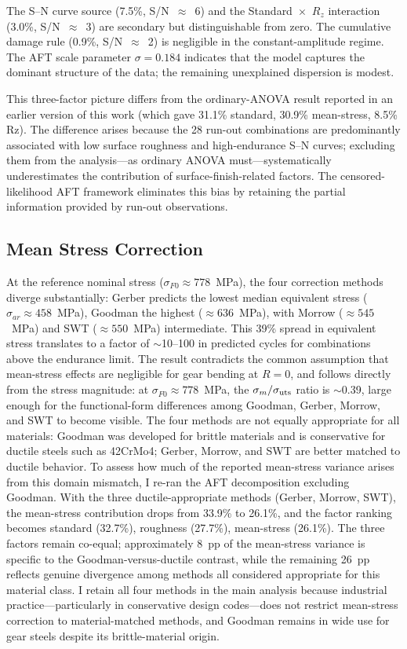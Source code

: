 \documentclass[12pt,a4paper]{article}
\begin{document}
The S--N curve source (7.5\%, S/N~$\approx$~6) and the
Standard~$\times$~$R_z$ interaction (3.0\%, S/N~$\approx$~3) are secondary but
distinguishable from zero. The cumulative damage rule (0.9\%,
S/N~$\approx$~2) is negligible in the constant-amplitude regime. The
AFT scale parameter $\sigma = 0.184$ indicates that the model
captures the dominant structure of the data; the remaining
unexplained dispersion is modest.

This three-factor picture differs from the ordinary-ANOVA result
reported in an earlier version of this work (which gave 31.1\%
standard, 30.9\% mean-stress, 8.5\% Rz). The difference arises
because the 28 run-out combinations are predominantly associated
with low surface roughness and high-endurance S--N curves; excluding
them from the analysis---as ordinary ANOVA must---systematically
underestimates the contribution of surface-finish-related factors.
The censored-likelihood AFT framework eliminates this bias by
retaining the partial information provided by run-out observations.

\subsection{Mean Stress Correction}

At the reference nominal stress ($\sigma_{F0} \approx 778$~MPa), the
four correction methods diverge substantially: Gerber predicts the
lowest median equivalent stress ($\sigma_{ar} \approx 458$~MPa),
Goodman the highest ($\approx 636$~MPa), with Morrow ($\approx 545$~MPa)
and SWT ($\approx 550$~MPa) intermediate. This 39\% spread in
equivalent stress translates to a factor of $\sim$10--100 in predicted
cycles for combinations above the endurance limit. The result contradicts
the common assumption that mean-stress effects are negligible for gear
bending at $R=0$, and follows directly from the stress magnitude: at
$\sigma_{F0} \approx 778$~MPa, the $\sigma_m/\sigma_{\rm uts}$ ratio
is $\sim$0.39, large enough for the functional-form differences among
Goodman, Gerber, Morrow, and SWT to become visible.
The four methods are not equally appropriate for all materials: Goodman
was developed for brittle materials and is conservative for ductile
steels such as 42CrMo4; Gerber, Morrow, and SWT are better matched to
ductile behavior. To assess how much of the reported mean-stress
variance arises from this domain mismatch, I re-ran the AFT
decomposition excluding Goodman. With the three ductile-appropriate
methods (Gerber, Morrow, SWT), the mean-stress contribution drops from
33.9\% to 26.1\%, and the factor ranking becomes standard (32.7\%),
roughness (27.7\%), mean-stress (26.1\%). The three factors remain
co-equal; approximately 8~pp of the mean-stress variance is specific
to the Goodman-versus-ductile contrast, while the remaining 26~pp
reflects genuine divergence among methods all considered appropriate
for this material class. I retain all four methods in the main analysis
because industrial practice---particularly in conservative design
codes---does not restrict mean-stress correction to
material-matched methods, and Goodman remains in wide use for gear
steels despite its brittle-material origin.
\end{document}
